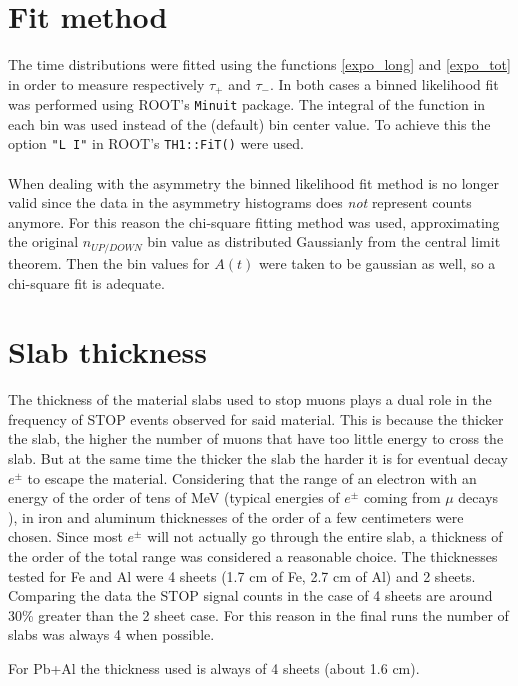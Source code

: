 \documentclass[10pt,a4paper,twocolumn]{article}
\begin{document}
\begin{appendices}
\section{Fit method}
\label{appendix:fitmethods}
The time distributions were fitted using the functions \ref{expo_long} and \ref{expo_tot} in order to measure respectively $\tau_+$ and $\tau_-$.
In both cases a binned likelihood fit was performed using ROOT's \texttt{Minuit} package. The integral of the function in each bin was used instead of the (default) bin center value. To achieve this the option \texttt{"L I"} in ROOT's \verb#TH1::FiT()# were used.
\\
\\
When dealing with the asymmetry the binned likelihood fit method is no longer valid since the data in the asymmetry histograms does \textit{not} represent counts anymore. For this reason the chi-square fitting method was used, approximating the original $n_{UP/DOWN}$ bin value as distributed Gaussianly from the central limit theorem. Then the bin values for $A(t)$ were taken to be gaussian as well, so a chi-square fit is adequate.


\section{Slab thickness}
\label{appendix:slabthickness}

The thickness of the material slabs used to stop muons plays a dual role in the frequency of STOP events observed for said material. This is because the thicker the slab, the higher the number of muons that have too little energy to cross the slab. But at the same time the thicker the slab the harder it is for eventual decay $e^\pm$ to escape the material. Considering that the range of an electron with an energy of the order of tens of MeV (typical energies of $e^\pm$ coming from $\mu$ decays \cite{e-article}), in iron and aluminum thicknesses of the order of a few centimeters were chosen. Since most $e^\pm$ will not actually go through the entire slab, a thickness of the order of the total range was considered a reasonable choice. The thicknesses tested for Fe and Al were 4 sheets (1.7 cm of Fe, 2.7 cm of Al) and 2 sheets. Comparing the data the STOP signal counts in the case of 4 sheets are around 30\% greater than the 2 sheet case. For this reason in the final runs the number of slabs was always 4 when possible.

For Pb+Al the thickness used is always of 4 sheets (about 1.6 cm).



\end{appendices}
\end{document}
